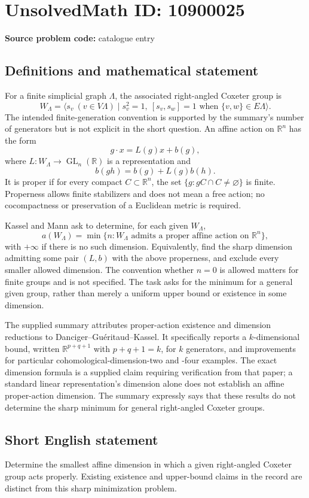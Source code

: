 \documentclass[11pt]{article}
\newcommand{\R}{\mathbb{R}}
\begin{document}
\section*{UnsolvedMath ID: 10900025}
\textbf{Source problem code:} catalogue entry
\subsection{Definitions and mathematical statement}
For a finite simplicial graph \(\Lambda\), the associated right-angled Coxeter group is
\[W_\Lambda=\langle s_v\ (v\in V\Lambda)\mid s_v^2=1,\ [s_v,s_w]=1\text{ when }\{v,w\}\in E\Lambda\rangle.\]
The intended finite-generation convention is supported by the summary's number of generators but is not explicit in the short question. An affine action on \(\R^n\) has the form
\[g\cdot x=L(g)x+b(g),\]
where \(L:W_\Lambda\to\operatorname{GL}_n(\R)\) is a representation and
\[b(gh)=b(g)+L(g)b(h).\]
It is proper if for every compact \(C\subset\R^n\), the set \(\{g:gC\cap C\ne\varnothing\}\) is finite. Properness allows finite stabilizers and does not mean a free action; no cocompactness or preservation of a Euclidean metric is required.

Kassel and Mann ask to determine, for each given \(W_\Lambda\),
\[a(W_\Lambda)=\min\{n:W_\Lambda\text{ admits a proper affine action on }\R^n\},\]
with \(+\infty\) if there is no such dimension. Equivalently, find the sharp dimension admitting some pair \((L,b)\) with the above properness, and exclude every smaller allowed dimension. The convention whether \(n=0\) is allowed matters for finite groups and is not specified. The task asks for the minimum for a general given group, rather than merely a uniform upper bound or existence in some dimension.

The supplied summary attributes proper-action existence and dimension reductions to Danciger--Gu\'eritaud--Kassel. It specifically reports a \(k\)-dimensional bound, written \(\R^{p+q+1}\) with \(p+q+1=k\), for \(k\) generators, and improvements for particular cohomological-dimension-two and -four examples. The exact dimension formula is a supplied claim requiring verification from that paper; a standard linear representation's dimension alone does not establish an affine proper-action dimension. The summary expressly says that these results do not determine the sharp minimum for general right-angled Coxeter groups.
\subsection{Short English statement}
Determine the smallest affine dimension in which a given right-angled Coxeter group acts properly. Existing existence and upper-bound claims in the record are distinct from this sharp minimization problem.
\end{document}
